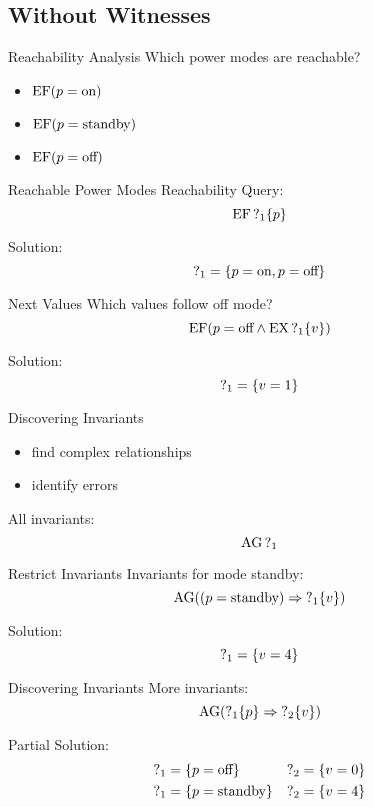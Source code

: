 \subsection{Without Witnesses}

\begin{frame}{Reachability Analysis}
  Which power modes are reachable?
  \begin{itemize}
    \item $\operatorname{EF} (p = \text{on})$
    \item $\operatorname{EF} (p = \text{standby})$
    \item $\operatorname{EF} (p = \text{off})$
  \end{itemize}
\end{frame}

\begin{frame}{Reachable Power Modes}
  Reachability Query:
  \[\operatorname{EF} \operatorname{?}_1\{p\}\]

  Solution:
  \[ \operatorname{?}_1 = \{p = \text{on}, p = \text{off}\} \]
\end{frame}

\begin{frame}{Next Values}
  Which values follow off mode?
  \[ \operatorname{EF} (p = \text{off} \land \operatorname{EX}\operatorname{?}_1\{v\}) \]

  Solution:
  \[ \operatorname{?}_1 = \{v = 1\} \]
\end{frame}

\begin{frame}{Discovering Invariants}
  \begin{itemize}
    \item find complex relationships
    \item identify errors
  \end{itemize}

  All invariants:
  \[ \operatorname{AG} \operatorname{?}_1 \]
\end{frame}

\begin{frame}{Restrict Invariants}
  Invariants for mode standby:
  \[ \operatorname{AG} ((p = \text{standby}) \Rightarrow \operatorname{?}_1\{v\}) \]

  Solution:
  \[ \operatorname{?}_1 = \{v = 4\} \]
\end{frame}

\begin{frame}{Discovering Invariants}
  More invariants:
  \[ \operatorname{AG} (\operatorname{?}_1\{p\} \Rightarrow \operatorname{?}_2\{v\}) \]
  
  Partial Solution:
  \begin{align*}
    \operatorname{?}_1 &= \{p = \text{off}\} &\operatorname{?}_2 &= \{v = 0\} \\
    \operatorname{?}_1 &= \{p = \text{standby}\} &\operatorname{?}_2 &= \{v = 4\}
  \end{align*}
\end{frame}

